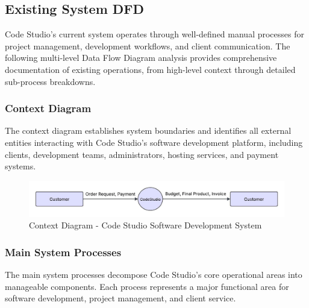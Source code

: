 \documentclass[12pt,a4paper]{article}
\begin{document}
\subsection{Existing System DFD}

Code Studio's current system operates through well-defined manual processes for project management, development workflows, and client communication. The following multi-level Data Flow Diagram analysis provides comprehensive documentation of existing operations, from high-level context through detailed sub-process breakdowns.

\subsubsection{Context Diagram}

The context diagram establishes system boundaries and identifies all external entities interacting with Code Studio's software development platform, including clients, development teams, administrators, hosting services, and payment systems.

\begin{figure}[H]
  \centering
  \includegraphics[width=0.9\linewidth]{"Thought web weaver (1).jpeg"}
  \caption{Context Diagram - Code Studio Software Development System}
\end{figure}

\subsubsection{Main System Processes}

The main system processes decompose Code Studio's core operational areas into manageable components. Each process represents a major functional area for software development, project management, and client service.
\end{document}
